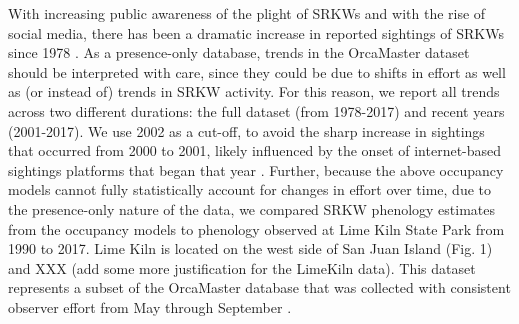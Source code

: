 \documentclass{article}
\begin{document}
\par With increasing public awareness of the plight of SRKWs and with the rise of social media, there has been a dramatic increase in reported sightings of SRKWs since 1978 \citep{olson2018}. As a presence-only database, trends in the OrcaMaster dataset should be interpreted with care, since they could be due to shifts in effort as well as (or instead of) trends in SRKW activity. For this reason, we report all trends across two different durations: the full dataset (from 1978-2017) and recent years (2001-2017). We use 2002 as a cut-off, to avoid the sharp increase in sightings that occurred from 2000 to 2001, likely influenced by the onset of internet-based sightings platforms that began that year \citep{olson2018}. Further, because the above occupancy models cannot fully statistically account for changes in effort over time, due to the presence-only nature of the data, we compared SRKW phenology estimates from the occupancy models to phenology observed at Lime Kiln State Park from 1990 to 2017. Lime Kiln is located on the west side of San Juan Island (Fig. 1) and XXX (add some more justification for the LimeKiln data). This dataset represents a subset of the OrcaMaster database that was collected with consistent observer effort from May through September \citep{olson2018}.  
\end{document}
